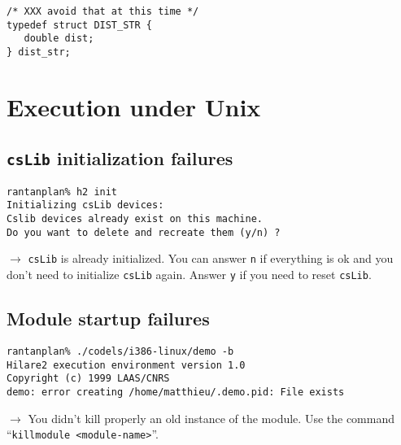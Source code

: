 \begin{center}\begin{cartouche}\small\begin{verbatim}
/* XXX avoid that at this time */
typedef struct DIST_STR {
   double dist;
} dist_str;
\end{verbatim}\end{cartouche}\end{center}


\section{Execution under Unix}

\subsection{{\tt csLib} initialization failures}

\begin{center}\begin{cartouche}\small\begin{verbatim}
rantanplan% h2 init
Initializing csLib devices: 
Cslib devices already exist on this machine.
Do you want to delete and recreate them (y/n) ? 
\end{verbatim}\end{cartouche}\end{center}

$\rightarrow$ {\tt csLib} is already initialized.  You can answer {\tt n}
if  everything is  ok  and  you  don't   need to initialize  {\tt  csLib}
again. Answer {\tt y} if you need to reset {\tt csLib}.


\subsection{Module startup failures}

\begin{center}\begin{cartouche}\small\begin{verbatim}
rantanplan% ./codels/i386-linux/demo -b
Hilare2 execution environment version 1.0
Copyright (c) 1999 LAAS/CNRS
demo: error creating /home/matthieu/.demo.pid: File exists
\end{verbatim}\end{cartouche}\end{center}

$\rightarrow$ You didn't kill properly an old instance of the module. Use
the command ``{\tt killmodule <module-name>}''.


